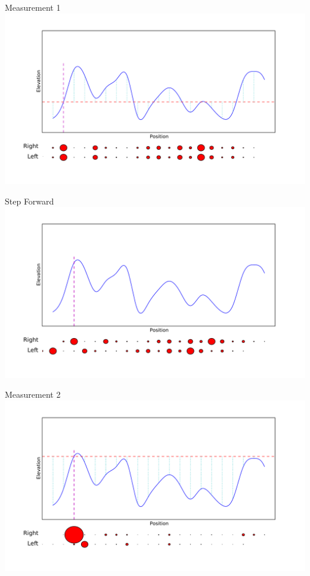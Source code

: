 \documentclass{beamer}
\begin{document}
\begin{frame}{Measurement 1}
\centering
\includegraphics[width=\textwidth]{meas1}\\
\end{frame}

\begin{frame}{Step Forward}
\centering
\includegraphics[width=\textwidth]{move1}\\
\end{frame}

\begin{frame}{Measurement 2}
\centering
\includegraphics[width=\textwidth]{meas2}\\
\end{frame}
\end{document}

